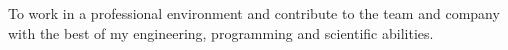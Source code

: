 To work in a professional environment and contribute to the team and company with the best of my engineering, programming and scientific abilities.
